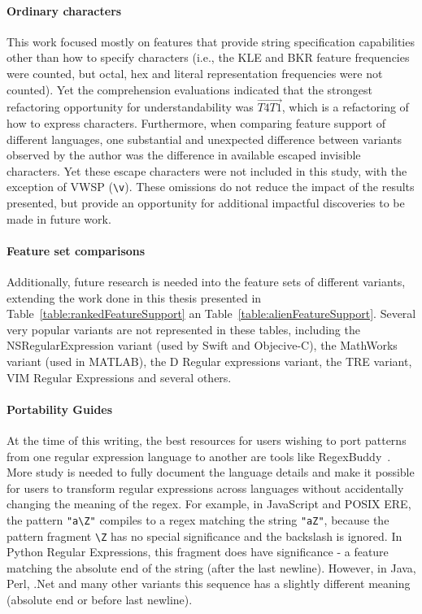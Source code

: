 \paragraph{Ordinary characters}  This work focused mostly on features that provide string specification capabilities other than how to specify characters (i.e., the KLE and BKR feature frequencies were counted, but octal, hex and literal representation frequencies were not counted).  Yet the comprehension evaluations indicated that the strongest refactoring opportunity for understandability was $\overrightarrow{T4 T1}$, which is a refactoring of how to express characters.  Furthermore, when comparing feature support of different languages, one substantial and unexpected difference between variants observed by the author was the difference in available escaped invisible characters.  Yet these escape characters were not included in this study, with the exception of VWSP (\verb!\v!).  These omissions do not reduce the impact of the results presented, but provide an opportunity for additional impactful discoveries to be made in future work.

\paragraph{Feature set comparisons} Additionally, future research is needed into the feature sets of different variants, extending the work done in this thesis presented in Table~\ref{table:rankedFeatureSupport} an Table~\ref{table:alienFeatureSupport}.  Several very popular variants are not represented in these tables, including the NSRegularExpression variant (used by Swift and Objecive-C), the MathWorks variant (used in MATLAB), the D Regular expressions variant, the TRE variant, VIM Regular Expressions and several others.

\paragraph{Portability Guides} At the time of this writing, the best resources for users wishing to port patterns from one regular expression language to another are tools like RegexBuddy~\citep{RegexBuddy}.  More study is needed to fully document the language details and make it possible for users to transform regular expressions across languages without accidentally changing the meaning of the regex.  For example, in JavaScript and POSIX ERE, the pattern \verb!"a\Z"! compiles to a regex matching the string \verb!"aZ"!, because the pattern fragment \verb!\Z! has no special significance and the backslash is ignored.  In Python Regular Expressions, this fragment does have significance - a feature matching the absolute end of the string (after the last newline).  However, in Java, Perl, .Net and many other variants this sequence has a slightly different meaning (absolute end or before last newline).


